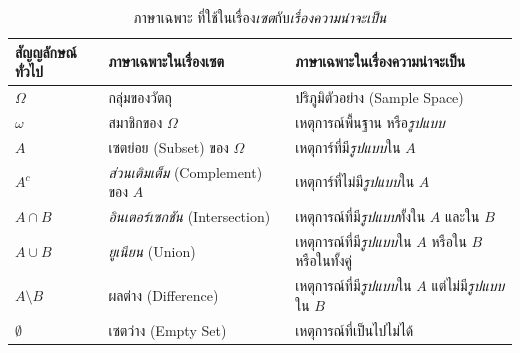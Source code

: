 \begin{table}[hbtp]
{\scriptsize
\caption{ภาษาเฉพาะ%
ที่ใช้ในเรื่อง\textit{เซต}กับ\textit{เรื่องความน่าจะเป็น}}
\begin{center}
\begin{tabular}{lll}
\hline
สัญญลักษณ์ทั่วไป  & ภาษาเฉพาะในเรื่องเซต & ภาษาเฉพาะในเรื่องความน่าจะเป็น \\
\hline
$\Omega$  & กลุ่มของวัตถุ & ปริภูมิตัวอย่าง (Sample Space) \\

$\omega$  & สมาชิกของ $\Omega$ & เหตุการณ์พื้นฐาน หรือ\textit{รูปแบบ} \\

$A$       & เซตย่อย (Subset) ของ $\Omega$ & เหตุการ์ที่มี\textit{รูปแบบ}ใน $A$ \\

$A^c$     & \textit{ส่วนเติมเต็ม} (Complement) ของ $A$ & เหตุการ์ที่ไม่มี\textit{รูปแบบ}ใน $A$ \\

$A \cap B$ & \textit{อินเตอร์เซกชัน} (Intersection) & เหตุการณ์ที่มี\textit{รูปแบบ}ทั้งใน $A$ และใน $B$ \\

$A \cup B$ & \textit{ยูเนียน} (Union) & เหตุการณ์ที่มี\textit{รูปแบบ}ใน $A$ หรือใน $B$ หรือในทั้งคู่\\

$A \setminus B$ & ผลต่าง (Difference) & เหตุการณ์ที่มี\textit{รูปแบบ}ใน $A$ แต่ไม่มี\textit{รูปแบบ}ใน $B$ \\



$\emptyset$ & เซตว่าง (Empty Set) & เหตุการณ์ที่เป็นไปไม่ได้ \\

\hline
 \end{tabular} 
\end{center}
\label{tbl: prop set jargon}
}%
\end{table}

